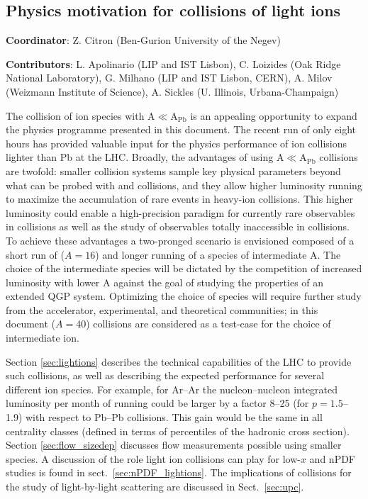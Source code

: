\subsection{Physics motivation for collisions of light ions}
\label{sec:smallAsum}
{ \small
\noindent \textbf{Coordinator}: Z. Citron (Ben-Gurion University of the Negev)

\noindent \textbf{Contributors}:
L. Apolinario (LIP and IST Lisbon),
C. Loizides (Oak Ridge National Laboratory),
G. Milhano (LIP and IST Lisbon, CERN),
A. Milov (Weizmann Institute of Science),
A. Sickles (U. Illinois, Urbana-Champaign)
}


The collision of ion species with A$\ll$A$_\mathrm{Pb}$ is an appealing opportunity to expand the physics programme presented in this document.  The recent \XeXe run of only eight hours has provided valuable input for the physics performance of ion collisions lighter than Pb at the LHC.  Broadly, the advantages of using A$\ll$A$_\mathrm{Pb}$  collisions are twofold: smaller collision systems sample key physical parameters beyond what can be probed with \PbPb and \pPb collisions, and they allow higher luminosity running to maximize the accumulation of rare events in heavy-ion collisions.  This higher luminosity could enable a high-precision paradigm for currently rare observables in \PbPb collisions as well as the study of observables totally inaccessible in \PbPb collisions.        
To achieve these advantages a two-pronged scenario is envisioned composed of a short run of \OO  ($A=16$) and longer running of a species of intermediate A.  The choice of the intermediate species will be dictated by the competition of increased luminosity with lower A against the goal of studying the properties of an extended QGP system. Optimizing the choice of species will require further study from the accelerator, experimental, and theoretical communities; in this document \ArAr ($A=40$) collisions are considered as a test-case for the choice of intermediate ion.

Section \ref{sec:lightions} describes the technical capabilities of the LHC to provide such collisions, as well as describing the expected performance for several different ion species.
For example, for Ar--Ar the nucleon--nucleon integrated luminosity per month of running could be larger by a factor 8--25 (for $p=1.5$--1.9) with respect to Pb--Pb collisions. This gain would be the same in all centrality classes (defined in terms of percentiles of the hadronic cross section).
Section \ref{sec:flow_sizedep} discusses flow measurements possible using smaller species.  A discussion of the role light ion collisions can play for low-$x$ and nPDF studies is found in sect.~\ref{sec:nPDF_lightions}.  The implications of \ArAr collisions for the study of light-by-light scattering are discussed in Sect.~\ref{sec:upc}. 

